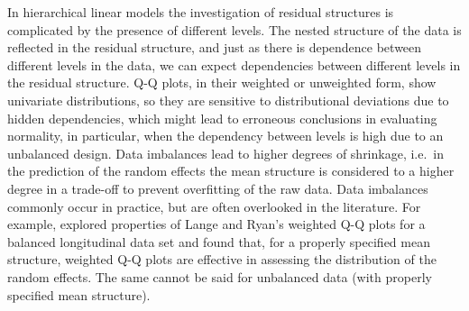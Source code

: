 \documentclass[12pt]{article} %
\newcommand{\hh}[1]{{\color{orange} #1}}
\newcommand{\al}[1]{{\color{red} #1}}
\begin{document}
In hierarchical linear models the investigation of residual structures is complicated by the presence of  different levels. 
The nested structure of the data is reflected in the residual structure, and just as there is dependence between different levels in the data, we can expect dependencies between different levels in the residual structure. 
Q-Q plots, in their weighted \citep{Dempster:1985tr, Lange:1989uu} or unweighted {form},  \hh{show univariate distributions, so they are sensitive to distributional deviations due to hidden dependencies}, which might lead to erroneous conclusions in evaluating normality, in particular, when the dependency between levels is high due to an unbalanced design. %
\hh{Data imbalances lead to higher degrees of shrinkage, i.e.~in the prediction of the random effects the mean structure is considered to a higher degree in a trade-off to prevent overfitting of the raw data.} 
Data imbalances commonly occur in practice, but are often overlooked in the literature. For example, \cite{Eberly:2005ee} explored properties of Lange and Ryan's weighted Q-Q plots for a balanced longitudinal data set and found that, for a properly specified mean structure,  weighted Q-Q plots are effective in  assessing the distribution of the random effects. The same cannot be said for unbalanced data (with properly specified mean structure). %


\end{document}
